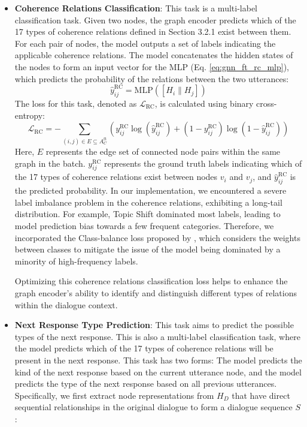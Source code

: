 \begin{itemize}
    \item \textbf{Coherence Relations Classification}: This task is a multi-label classification task. Given two nodes, the graph encoder predicts which of the 17 types of coherence relations defined in Section 3.2.1 exist between them. For each pair of nodes, the model outputs a set of labels indicating the applicable coherence relations. The model concatenates the hidden states of the nodes to form an input vector for the MLP (Eq. \ref{eq:gnn_ft_rc_mlp}), which predicts the probability of the relations between the two utterances:
    \begin{equation} \label{eq:gnn_ft_rc_mlp}
        \hat{y}_{ij}^{\text{RC}} = \text{MLP}([H_i \parallel H_j])
    \end{equation}
    The loss for this task, denoted as \( \mathcal{L}_{\text{RC}} \), is calculated using binary cross-entropy:
    \begin{equation}
        \mathcal{L}_{\text{RC}} = -\sum_{(i, j) \in E \subseteq A_{C}^{\text{ft}}} \left( y_{ij}^{\text{RC}} \log(\hat{y}_{ij}^{\text{RC}}) + (1 - y_{ij}^{\text{RC}}) \log(1 - \hat{y}_{ij}^{\text{RC}}) \right)
    \end{equation}
    Here, $E$ represents the edge set of connected node pairs within the same graph in the batch. \( y_{ij}^{\text{RC}} \) represents the ground truth labels indicating which of the 17 types of coherence relations exist between nodes $v_{i}$ and $v_j$, and \( \hat{y}_{ij}^{\text{RC}} \) is the predicted probability. In our implementation, we encountered a severe label imbalance problem in the coherence relations, exhibiting a long-tail distribution. For example, Topic Shift dominated most labels, leading to model prediction bias towards a few frequent categories. Therefore, we incorporated the Class-balance loss proposed by \cite{cui-etal-2019-cbloss}, which considers the weights between classes to mitigate the issue of the model being dominated by a minority of high-frequency labels. 
    
    Optimizing this coherence relations classification loss helps to enhance the graph encoder's ability to identify and distinguish different types of relations within the dialogue context.

    \item \textbf{Next Response Type Prediction}: This task aims to predict the possible types of the next response. This is also a multi-label classification task, where the model predicts which of the 17 types of coherence relations will be present in the next response. This task has two forms: The model predicts the kind of the next response based on the current utterance node, and the model predicts the type of the next response based on all previous utterances. Specifically, we first extract node representations from $H_D$ that have direct sequential relationships in the original dialogue to form a dialogue sequence $S$:


\end{itemize}
